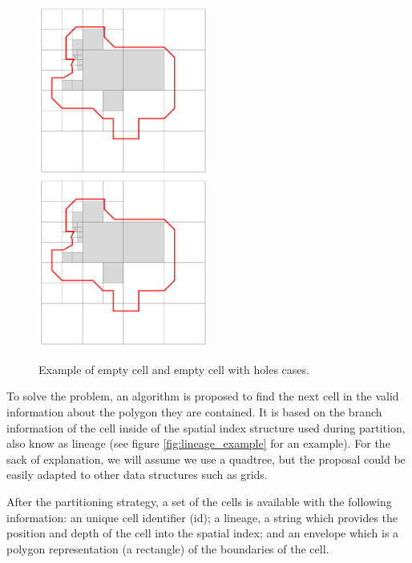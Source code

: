 \begin{figure}[!ht]
    \centering
    \includegraphics[page=1, width=0.5\textwidth]{figures/cellinpolygon/emptycells.pdf}
    \includegraphics[page=2, width=0.5\textwidth]{figures/cellinpolygon/emptycells.pdf}
    \caption{Example of empty cell and empty cell with holes cases.}\label{fig:emptycells}
\end{figure}

To solve the problem, an algorithm is proposed to find the next cell in the valid information about the polygon they are contained.  It is based on the branch information of the cell inside of the spatial index structure used during partition, also know as lineage (see figure \ref{fig:lineage_example} for an example).  For the sack of explanation, we will assume we use a quadtree, but the proposal could be easily adapted to other data structures such as grids.

After the partitioning strategy, a set of the cells is available with the following information: an unique cell identifier (id); a lineage, a string which provides the position and depth of the cell into the spatial index; and an envelope which is a polygon representation (a rectangle) of the boundaries of the cell.


